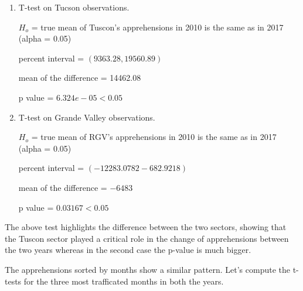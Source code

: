 \documentclass[journal, a4paper]{IEEEtran}
\begin{document}
\begin{enumerate}

\item T-test on Tucson observations.

\subitem $ H_{o} $ =  true mean of Tuscon's apprehensions in 2010 is the same as in 2017 (alpha = 0.05)

 percent interval = $ (9363.28,  19560.89) $

\subitem mean of the difference = 14462.08 

\subitem p value = $ 6.324e-05 < 0.05$

\item T-test on Grande Valley observations.

\subitem $ H_{o} $ = true mean of RGV's apprehensions in 2010 is the same as in 2017 (alpha = 0.05)

 percent interval = $ (-12283.0782   -682.9218) $

\subitem mean of the difference = $ -6483  $

\subitem p value = $  0.03167 < 0.05$

\end{enumerate}

The above test highlights the difference between the two sectors, showing that the Tuscon sector played a critical role in the change of apprehensions between the two years whereas in the second case the p-value is much bigger.

The apprehensions sorted by months show a similar pattern. Let's compute the t-tests for the three most trafficated months in both the years.
\end{document}
